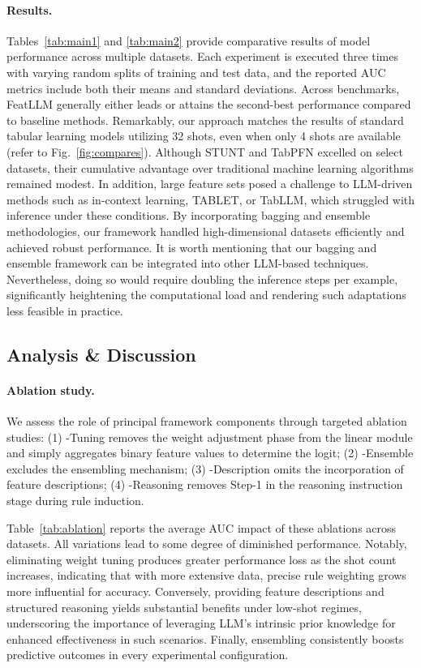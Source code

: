 \vspace*{-0.12in}
\paragraph{Results.}
Tables~\ref{tab:main1} and \ref{tab:main2} provide comparative results of model performance across multiple datasets. Each experiment is executed three times with varying random splits of training and test data, and the reported AUC metrics include both their means and standard deviations. Across benchmarks, \textsf{FeatLLM} generally either leads or attains the second-best performance compared to baseline methods. Remarkably, our approach matches the results of standard tabular learning models utilizing 32 shots, even when only 4 shots are available (refer to Fig.~\ref{fig:compares}). Although STUNT and TabPFN excelled on select datasets, their cumulative advantage over traditional machine learning algorithms remained modest. In addition, large feature sets posed a challenge to LLM-driven methods such as in-context learning, TABLET, or TabLLM, which struggled with inference under these conditions. By incorporating bagging and ensemble methodologies, our framework handled high-dimensional datasets efficiently and achieved robust performance. It is worth mentioning that our bagging and ensemble framework can be integrated into other LLM-based techniques. Nevertheless, doing so would require doubling the inference steps per example, significantly heightening the computational load and rendering such adaptations less feasible in practice.

\subsection{Analysis \& Discussion}
\label{sec:analysis}
\paragraph{Ablation study.} We assess the role of principal framework components through targeted ablation studies: (1) \textsf{-Tuning} removes the weight adjustment phase from the linear module and simply aggregates binary feature values to determine the logit; (2) \textsf{-Ensemble} excludes the ensembling mechanism; (3) \textsf{-Description} omits the incorporation of feature descriptions; (4) \textsf{-Reasoning} removes Step-1 in the reasoning instruction stage during rule induction.

Table~\ref{tab:ablation} reports the average AUC impact of these ablations across datasets. All variations lead to some degree of diminished performance. Notably, eliminating weight tuning produces greater performance loss as the shot count increases, indicating that with more extensive data, precise rule weighting grows more influential for accuracy. Conversely, providing feature descriptions and structured reasoning yields substantial benefits under low-shot regimes, underscoring the importance of leveraging LLM's intrinsic prior knowledge for enhanced effectiveness in such scenarios. Finally, ensembling consistently boosts predictive outcomes in every experimental configuration.

